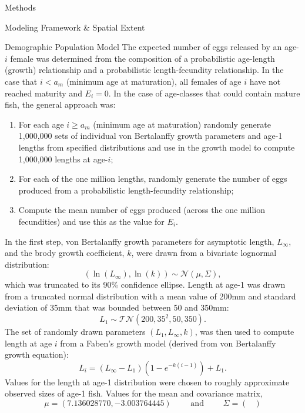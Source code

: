 \documentclass[12pt]{article}
\begin{document}
\begin{section}{Methods}
\begin{subsection}{Modeling Framework \& Spatial Extent}
\begin{subsubsection}{Demographic Population Model}
\vspace{-6pt}The expected number of eggs released by an age-$i$ female was determined from the composition of a probabilistic age-length (growth) relationship and a probabilistic length-fecundity relationship.  In the case that $i<a_m$ (minimum age at maturation), all females of age $i$ have not reached maturity and $E_i=0$. In the case of age-classes that could contain mature fish, the general approach was:
\begin{enumerate}
\item For each age $i\geq a_m$ (minimum age at maturation) randomly generate 1,000,000 sets of individual von Bertalanffy growth parameters and age-1 lengths from specified distributions and use in the growth model to compute 1,000,000 lengths at age-$i$;
\item For each of the one million lengths, randomly generate the number of eggs produced from a probabilistic length-fecundity relationship;
\item Compute the mean number of eggs produced (across the one million fecundities) and use this as the value for $E_i$.
\end{enumerate}
In the first step, von Bertalanffy growth parameters for asymptotic length, $L_\infty$, and the brody growth coefficient, $k$, were drawn from a bivariate lognormal distribution:
\begin{equation}
\left(\ln(L_\infty), \ln(k)\right) \sim \mathcal{N}\left(\mu, \Sigma\right),
\end{equation}
 which was truncated to its 90\% confidence ellipse.  Length at age-1 was drawn from a truncated normal distribution with a mean value of 200mm and standard deviation of 35mm that was bounded between 50 and 350mm: 
\begin{equation}
L_1 \sim \mathcal{TN}\left(200, 35^2, 50, 350\right).
\end{equation}
The set of randomly drawn parameters $(L_1, L_\infty, k)$, was then used to compute length at age $i$ from a Faben's growth model (derived from von Bertalanffy growth equation): 
\begin{equation}
L_i = \left(L_\infty-L_1\right)\left(1-e^{-k(i-1)}\right)+L_1.
\end{equation}
Values for the length at age-1 distribution were chosen to roughly approximate observed sizes of age-1 fish.  Values for the mean and covariance matrix,
\begin{equation}
\mu=(7.136028770, -3.003764445) \hspace{24pt} \mbox{ and } \hspace{24pt} \Sigma=\begin{pmatrix}

\end{pmatrix}
\end{equation}
\end{subsubsection}
\end{subsection}
\end{section}
\end{document}

